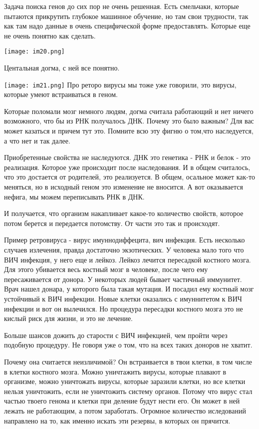 Задача поиска генов до сих пор не очень решенная. Есть смельчаки, 
которые пытаются прикрутить глубокое машинное обучение, но 
там свои трудности, так как там надо данные в очень специфической форме 
предоставлять. Которые еще не очень понятно как сделать. 

\texttt{[image: im20.png]}

Центальная догма, с ней все понятно. 

\texttt{[image: im21.png]}
Про реторо вирусы мы тоже уже говорили, это вирусы, которые 
умеют встраиваться в геном. 

Которые поломали мозг немного людям, догма считала работающий и 
нет ничего возможного, что бы из РНК получалось ДНК. 
Почему это было важным? Для вас может казаться и причем тут это. 
Помните всю эту фигню о том,что наследуется, а что нет и так далее. 

Приобретенные свойства не наследуются. ДНК это генетика - РНК и белок - это 
реализация. Которое уже происходит после наследования. И в общем считалось, что 
это достается от родителей, это реализуется. В общем, осальное может как-то меняться, 
но в исходный геном это изменение не вносится. А вот оказывается нефига, 
мы можем переписывать РНК в ДНК. 

И получается, что организм накапливает какое-то количество свойств, 
которое потом берется и передается потомству. От части это так и происходят. 


Пример ретровируса - вирус имуннодиффецита, вич инфекция. Есть несколько 
случаев излечения, правда достаточно экзотических. У человека мало того что
ВИЧ инфекция, у него еще и лейкоз. Лейкоз лечится пересадкой костного мозга.
Для этого убивается весь костный мозг в человеке,
после чего ему пересаживается от донора. У некоторых
людей бывает частичный иммунитет. Врач нашел донара, у которого была такая
мутация. И посадил ему костный мозг устойчивый к ВИЧ инфекции. Новые клетки
оказались с имуннитетом к ВИЧ инфекции и вот он вылечился. Но процедура
пересадки костного мозга это не кислый риск для жизни, и это не лечение.

Больше шансов дожить до старости с ВИЧ инфекцией, чем пройти через подобную процедуру.
Не говоря уже о том, что на всех таких доноров не хватит.

Почему она считается неизличимой? Он встраивается в твои клетки, в том
числе в клетки костного мозга. Можно уничтажить вирусы, которые плавают в организме,
можно уничтожать вирусы, которые заразили клетки, но все клетки нельзя уничтожить,
если не уничтожить систему органов. Потому что вирус стал частью твоего генома и
клетки при деление будут нести его. Он может в ней лежать не работающим,
а потом заработать. Огромное количество иследований направлено на то,
как именно искать эти резервы, в которых он прячится.

